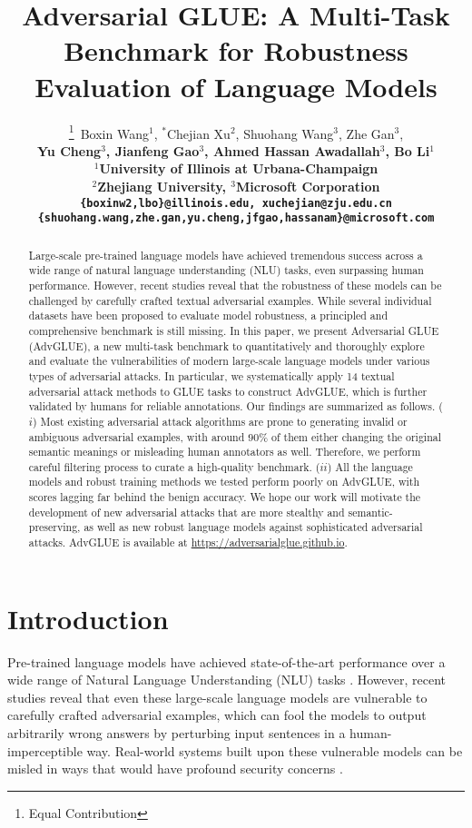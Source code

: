 \documentclass{article}
\title{Adversarial GLUE: A Multi-Task Benchmark for Robustness Evaluation of Language Models}
\author{\thanks{Equal Contribution}$\,$ Boxin Wang$^1$, $^*$Chejian Xu$^2$, Shuohang Wang$^3$, Zhe Gan$^3$, \\
  \bf Yu Cheng$^3$, Jianfeng Gao$^3$, Ahmed Hassan Awadallah$^3$, Bo Li$^1$ \\
  $^1$University of Illinois at Urbana-Champaign \\
  $^2$Zhejiang University,
  $^3$Microsoft Corporation\\
  \texttt{\small\{boxinw2,lbo\}@illinois.edu, xuchejian@zju.edu.cn}  \\
  \texttt{\small \{shuohang.wang,zhe.gan,yu.cheng,jfgao,hassanam\}@microsoft.com} \\ 
}
\newcommand{\method}{AdvGLUE\xspace}
\begin{document}
\maketitle

\begin{abstract}
Large-scale pre-trained language models have achieved tremendous success across a wide range of natural language understanding (NLU) tasks, even surpassing human performance. However, recent studies reveal that the robustness of these models can be challenged by carefully crafted textual adversarial examples. While several individual datasets have been proposed to evaluate model robustness,
a principled and comprehensive benchmark is still missing. In this paper, we present Adversarial GLUE (\method), a new multi-task benchmark to quantitatively and thoroughly explore and evaluate the vulnerabilities of modern large-scale language models under various types of adversarial attacks. In particular, we systematically apply 14 textual adversarial attack methods to GLUE tasks to construct AdvGLUE, which is further validated by humans for reliable annotations.
Our findings are summarized as follows.
($i$) Most existing adversarial attack algorithms are prone to generating invalid or ambiguous adversarial examples, with around $90\%$ of them either changing the original semantic meanings or misleading  human annotators as well. Therefore, we perform careful filtering process to curate a high-quality benchmark.
($ii$) All the language models and robust training methods we tested perform poorly on \method, with scores lagging far behind the benign accuracy.
We hope our work will motivate the development of new adversarial attacks that are more stealthy and semantic-preserving, as well as new robust language models against sophisticated adversarial attacks. AdvGLUE is available at \url{https://adversarialglue.github.io}.
\end{abstract}

\section{Introduction}

Pre-trained language models \citep{bert,roberta,Lan2019ALBERTAL,Yang2019XLNetGA,he2020deberta,zhang2019ernie,smart,clark2020electra} have achieved state-of-the-art performance over a wide range of Natural Language Understanding (NLU) tasks \citep{wang2018glue,wang2019superglue,advsquad,advfever,anli}. 
However, recent studies \citep{textfooler,comattack,t3,bertattack,bae} reveal that even these large-scale language models are vulnerable to carefully crafted adversarial examples, which can fool the models to output arbitrarily wrong answers by perturbing input sentences in a human-imperceptible way. 
Real-world systems built upon these vulnerable models can be misled in ways that would have profound security concerns \citep{textbugger,textshield}.
\end{document}
